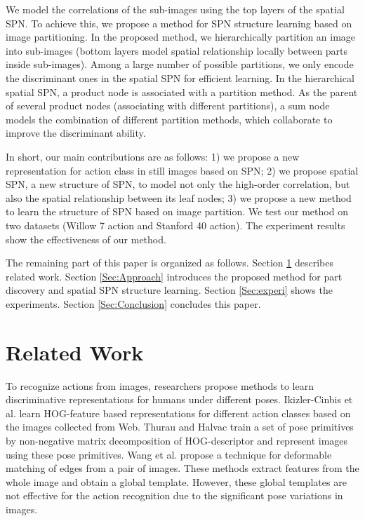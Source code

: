 \documentclass[journal]{IEEEtran}
\begin{document}
We model the correlations of the sub-images using the top layers of the spatial SPN. To achieve this, we propose a method for SPN structure learning based on image partitioning.
In the proposed method, we hierarchically partition an image into sub-images (bottom layers model spatial relationship locally between parts inside sub-images). Among a large number of possible partitions, we only encode the discriminant ones in the spatial SPN for efficient learning. In the hierarchical spatial SPN, a product node is associated with a partition method. As the parent of several product nodes (associating with different partitions), a sum node models the combination of different partition methods, which collaborate to improve the discriminant ability.  



In short, our main contributions are as follows:
1) we propose a new representation for action class in still images based on SPN;
2) we propose spatial SPN, a new structure of SPN, to model not only the high-order correlation, but also the spatial relationship between its leaf nodes;
3) we propose a new method to learn the structure of SPN based on image partition.
We test our method on two datasets (Willow 7 action and Stanford 40 action). The experiment results show the effectiveness of our method. 


The remaining part of this paper is organized as follows. Section \ref{Sec:Related_work} describes related work. Section \ref{Sec:Approach} introduces the proposed method for part discovery and spatial SPN structure learning. Section \ref{Sec:experi} shows the experiments. Section \ref{Sec:Conclusion} concludes this paper.  



\section{Related Work}
\label{Sec:Related_work}

To recognize actions from images, researchers propose methods to learn discriminative representations for humans under different poses. Ikizler-Cinbis et al. \cite{ikizlercinbisICCV2009} learn HOG-feature based representations for different action classes based on the images collected from Web. Thurau and Halvac \cite{Thurau-HlavacPosePrimitivesCVPR2008} train a set of pose primitives by non-negative matrix decomposition of HOG-descriptor and represent images using these pose primitives. Wang et al. \cite{DBLP:conf/cvpr/WangJDLM06} propose a technique for deformable matching of edges from a pair of images. These methods \cite{ikizlercinbisICCV2009,Thurau-HlavacPosePrimitivesCVPR2008,DBLP:conf/cvpr/WangJDLM06} extract features from the whole image and obtain a global template. However, these global templates are not effective for the action recognition due to the significant pose variations in images.
\end{document}

